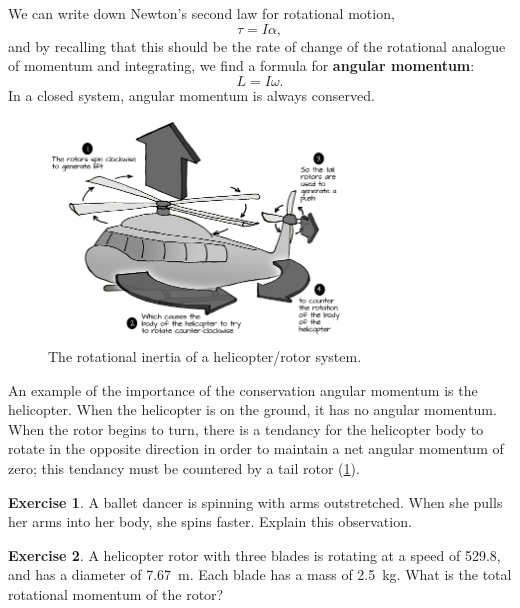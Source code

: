 \documentclass[a4paper]{amsbook}
\theoremstyle{definition}
\newtheorem{exercise}{Exercise}
\numberwithin{exercise}{chapter}
\numberwithin{exercise}{chapter}
\begin{document}
We can write down Newton's second law for rotational motion,
\begin{equation}
  \tau = I \alpha,
\end{equation}
and by recalling that this should be the rate of change of the rotational analogue of momentum and integrating,
we find a formula for \textbf{angular momentum}:
\begin{equation}
  L = I\omega.
\end{equation}
In a closed system, angular momentum is always conserved.

\begin{figure}
  \centering
  \includegraphics[width=0.7\textwidth]{helicopter}
  \caption{The rotational inertia of a helicopter/rotor system.\label{fig:helicopter}}
\end{figure}

An example of the importance of the conservation angular momentum is the helicopter. When the helicopter is on the ground, it has no angular
momentum. When the rotor begins to turn, there is a tendancy for the helicopter body to rotate in the opposite direction in order to maintain
a net angular momentum of zero; this tendancy must be countered by a tail rotor (\cref{fig:helicopter}).

\begin{exercise}
  A ballet dancer is spinning with arms outstretched. When she pulls her arms into her body, she spins faster.
  Explain this observation.
\end{exercise}

\begin{exercise}
  A helicopter rotor with three blades is rotating at a speed of \SI{529.8}{\rpm}, and has a diameter
  of \SI{7.67}{\metre}. Each blade has a mass of \SI{2.5}{\kilo\gram}. What is the total rotational momentum of the rotor?
\end{exercise}
\end{document}
